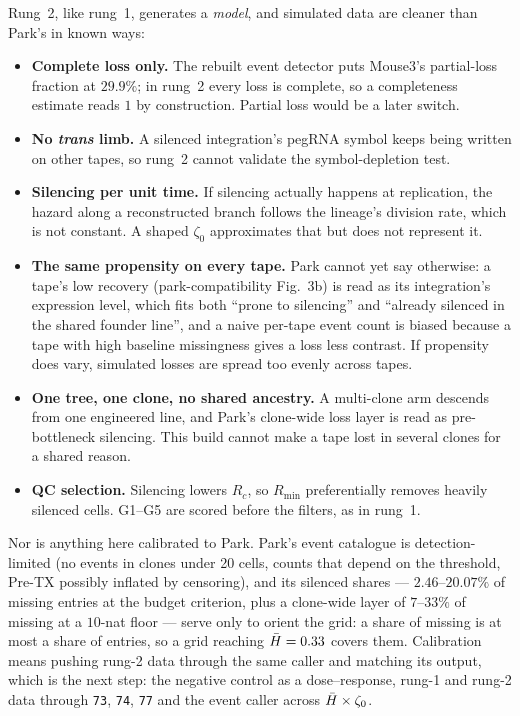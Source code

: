 Rung~2, like rung~1, generates a \emph{model}, and simulated data are cleaner than Park's in known ways:
\begin{itemize}
  \item \textbf{Complete loss only.} The rebuilt event detector puts Mouse3's partial-loss fraction at
        $29.9\%$; in rung~2 every loss is complete, so a completeness estimate reads $1$ by construction.
        Partial loss would be a later switch.
  \item \textbf{No \emph{trans} limb.} A silenced integration's pegRNA symbol keeps being written on other
        tapes, so rung~2 cannot validate the symbol-depletion test.
  \item \textbf{Silencing per unit time.} If silencing actually happens at replication, the hazard along
        a reconstructed branch follows the lineage's division rate, which is not constant. A shaped
        $\zeta_0$ approximates that but does not represent it.
  \item \textbf{The same propensity on every tape.} Park cannot yet say otherwise: a tape's low recovery
        (park-compatibility Fig.~3b) is read as its integration's expression level, which fits both
        ``prone to silencing'' and ``already silenced in the shared founder line'', and a naive per-tape
        event count is biased because a tape with high baseline missingness gives a loss less contrast.
        If propensity does vary, simulated losses are spread too evenly across tapes.
  \item \textbf{One tree, one clone, no shared ancestry.} A multi-clone arm descends from one engineered
        line, and Park's clone-wide loss layer is read as pre-bottleneck silencing. This build cannot
        make a tape lost in several clones for a shared reason.
  \item \textbf{QC selection.} Silencing lowers $R_c$, so $R_{\min}$ preferentially removes heavily
        silenced cells. G1--G5 are scored before the filters, as in rung~1.
\end{itemize}
Nor is anything here calibrated to Park. Park's event catalogue is detection-limited (no events in
clones under 20 cells, counts that depend on the threshold, Pre-TX possibly inflated by censoring), and
its silenced shares --- $2.46$--$20.07\%$ of missing entries at the budget criterion, plus a clone-wide
layer of $7$--$33\%$ of missing at a $10$-nat floor --- serve only to orient the grid: a share of missing
is at most a share of entries, so a grid reaching $\bar H=0.33$ covers them. Calibration means pushing
rung-2 data through the same caller and matching its output, which is the next step: the negative
control as a dose--response, rung-1 and rung-2 data through \texttt{73}, \texttt{74}, \texttt{77} and the
event caller across $\bar H\times\zeta_0$.
